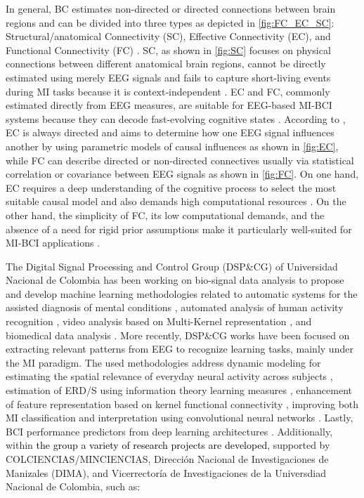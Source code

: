 In general, BC estimates non-directed or directed connections between brain regions and can be divided into three types as depicted in \cref{fig:FC_EC_SC}: Structural/anatomical Connectivity (SC), Effective Connectivity (EC), and Functional Connectivity (FC) \cite{leeuwis2021functional, friston2002functional}. SC, as shown in \cref{fig:SC} focuses on physical connections between different anatomical brain regions, cannot be directly estimated using merely EEG signals and fails to capture short-living events during MI tasks because it is context-independent \cite{thiebaut2020brain, yeh2021mapping}. EC and FC, commonly estimated directly from EEG measures, are suitable for EEG-based MI-BCI systems because they can decode fast-evolving cognitive states \cite{cao2022brain}. According to \cite{friston2013analysing}, EC is always directed and aims to determine how one EEG signal influences another by using parametric models of causal influences as shown in \cref{fig:EC}, while FC can describe directed or non-directed connectives usually via statistical correlation or covariance between EEG signals as shown in \cref{fig:FC}. On one hand, EC requires a deep understanding of the cognitive process to select the most suitable causal model and also demands high computational resources \cite{chiarion2023connectivity, lee2020predicting}. On the other hand, the simplicity of FC, its low computational demands, and the absence of a need for rigid prior assumptions make it particularly well-suited for MI-BCI applications \cite{he2019electrophysiological, hamedi2016electroencephalographic, sakkalis2011review, friston2011functional}.

The Digital Signal Processing and Control Group (DSP\&CG) of Universidad Nacional de Colombia has been working on bio-signal data analysis to propose and develop machine learning methodologies related to automatic systems for the assisted diagnosis of mental conditions \cite{cardenas2017enhanced}, automated analysis of human activity recognition \cite{pulgarin2017relevant}, video analysis based on Multi-Kernel representation \cite{molina2015video}, and biomedical data analysis \cite{hurtado2016identification}. More recently, DSP\&CG works have been focused on extracting relevant patterns from EEG to recognize learning tasks, mainly under the MI paradigm. The used methodologies address dynamic modeling for estimating the spatial relevance of everyday neural activity across subjects \cite{velasquez2020dynamic}, estimation of ERD/S using information theory learning measures \cite{velasquez2020entropy}, enhancement of feature representation based on kernel functional connectivity \cite{garcia2021single}, improving both MI classification and interpretation using convolutional neural networks \cite{collazos2020cnn}. Lastly, BCI performance predictors from deep learning architectures \cite{caicedo2021deep}. Additionally, within \textcolor{black}{the group a variety of research projects are developed}, supported by COLCIENCIAS/MINCIENCIAS, Dirección Nacional de Investigaciones de Manizales (DIMA), and Vicerrectoría de Investigaciones de la Universdiad Nacional de Colombia, such as:

